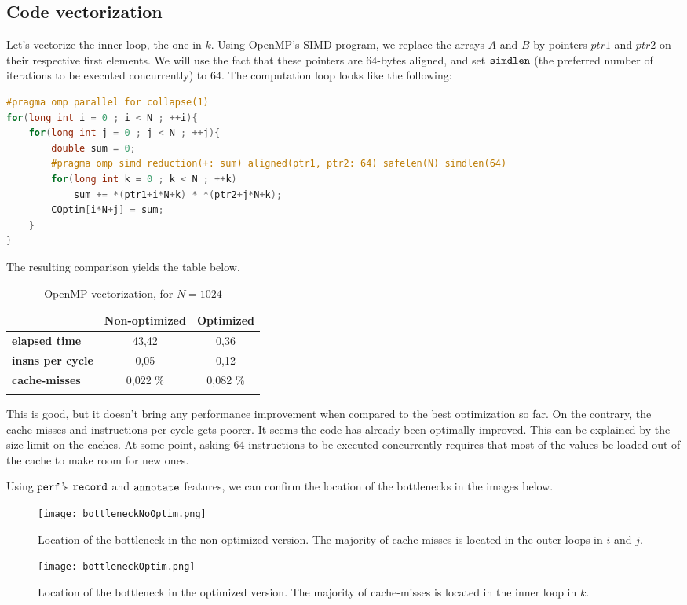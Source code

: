 \documentclass[a4paper, 10 pt, conference]{ieeeconf}
\newcommand{\tabhead}[1]{{\bfseries#1}}
\begin{document}
\subsection{Code vectorization}
Let's vectorize the inner loop, the one in $k$. Using OpenMP's SIMD program, we replace the arrays $A$ and $B$ by pointers $ptr1$ and $ptr2$ on their respective first elements. We will use the fact that these pointers are $64$-bytes aligned, and set $\verb|simdlen|$ (the preferred number of iterations to be executed concurrently) to $64$. The computation loop looks like the following:
\begin{lstlisting}[language=C++, caption={OpenMP inner loop vectorization},breaklines]
#pragma omp parallel for collapse(1)
for(long int i = 0 ; i < N ; ++i){
    for(long int j = 0 ; j < N ; ++j){
        double sum = 0;
        #pragma omp simd reduction(+: sum) aligned(ptr1, ptr2: 64) safelen(N) simdlen(64)
        for(long int k = 0 ; k < N ; ++k)
            sum += *(ptr1+i*N+k) * *(ptr2+j*N+k);
        COptim[i*N+j] = sum;
    }
}
\end{lstlisting}
The resulting comparison yields the table below.
\begin{table}[h!]
    \centering
    \begin{tabular}{l c c}
        \toprule
         & \tabhead{Non-optimized} & \tabhead{Optimized} \\
        \midrule
        \tabhead{elapsed time} & 43,42 & 0,36 \\
        \tabhead{insns per cycle} & 0,05 & 0,12 \\
        \tabhead{cache-misses} & 0,022  \% & 0,082 \%\\
        \bottomrule\\
    \end{tabular}
    \caption{OpenMP vectorization, for $N=1024$}
\end{table}
This is good, but it doesn't bring any performance improvement when compared to the best optimization so far. On the contrary, the cache-misses and instructions per cycle gets poorer. It seems the code has already been optimally improved. This can be explained by the size limit on the caches. At some point, asking 64 instructions to be executed concurrently requires that most of the values be loaded out of the cache to make room for new ones.

Using $\verb|perf|$'s $\verb|record|$ and $\verb|annotate|$ features, we can confirm the location of the bottlenecks in the images below. 
\begin{figure}[H]
    \centering
    \texttt{[image: bottleneckNoOptim.png]}
    \caption{Location of the bottleneck in the non-optimized version. The majority of cache-misses is located in the outer loops in $i$ and $j$.}
\end{figure}
\begin{figure}[H]
    \centering
    \texttt{[image: bottleneckOptim.png]}
    \caption{Location of the bottleneck in the optimized version. The majority of cache-misses is located in the inner loop in $k$.}
\end{figure}
\end{document}
